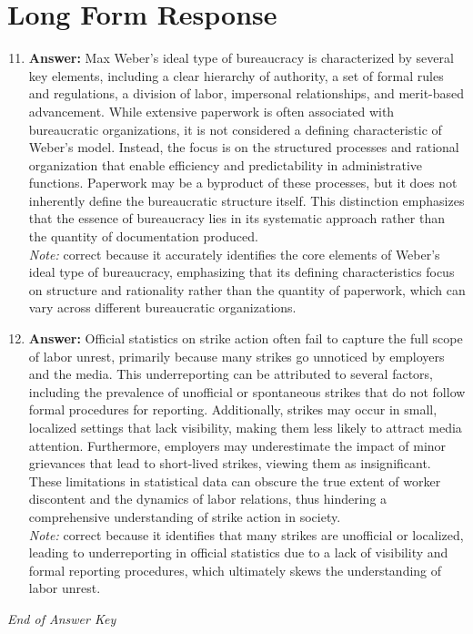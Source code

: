 \documentclass[12pt]{article}
\begin{document}
\section*{Long Form Response}
\begin{enumerate}[label=\arabic*.]
\setcounter{enumi}{10}
\item \textbf{Answer:} Max Weber's ideal type of bureaucracy is characterized by several key elements, including a clear hierarchy of authority, a set of formal rules and regulations, a division of labor, impersonal relationships, and merit-based advancement. While extensive paperwork is often associated with bureaucratic organizations, it is not considered a defining characteristic of Weber's model. Instead, the focus is on the structured processes and rational organization that enable efficiency and predictability in administrative functions. Paperwork may be a byproduct of these processes, but it does not inherently define the bureaucratic structure itself. This distinction emphasizes that the essence of bureaucracy lies in its systematic approach rather than the quantity of documentation produced.
\\ \textit{Note:} correct because it accurately identifies the core elements of Weber's ideal type of bureaucracy, emphasizing that its defining characteristics focus on structure and rationality rather than the quantity of paperwork, which can vary across different bureaucratic organizations.
\item \textbf{Answer:} Official statistics on strike action often fail to capture the full scope of labor unrest, primarily because many strikes go unnoticed by employers and the media. This underreporting can be attributed to several factors, including the prevalence of unofficial or spontaneous strikes that do not follow formal procedures for reporting. Additionally, strikes may occur in small, localized settings that lack visibility, making them less likely to attract media attention. Furthermore, employers may underestimate the impact of minor grievances that lead to short-lived strikes, viewing them as insignificant. These limitations in statistical data can obscure the true extent of worker discontent and the dynamics of labor relations, thus hindering a comprehensive understanding of strike action in society.
\\ \textit{Note:} correct because it identifies that many strikes are unofficial or localized, leading to underreporting in official statistics due to a lack of visibility and formal reporting procedures, which ultimately skews the understanding of labor unrest.
\end{enumerate}

\vfill
\noindent\textit{End of Answer Key}
\end{document}

